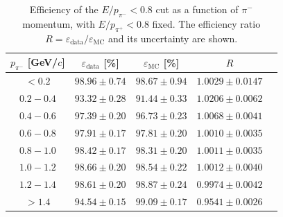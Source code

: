 \begin{table}[htbp]
    \begin{center}
        \caption{Efficiency of the \(E/p_{\pi^-}<0.8\) cut as a function of \(\pi^-\) momentum, with \(E/p_{\pi^+}<0.8\) fixed. The efficiency ratio \(R = \varepsilon_{\text{data}}/\varepsilon_{\text{MC}}\) and its uncertainty are shown.}
        \vspace{4mm}
        \renewcommand{\arraystretch}{1.3}
        \begin{tabular}{c | c c c c}
            \hline \hline
            \(p_{\pi^-}\) [GeV/\(c\)] & \(\varepsilon_{\text{data}}\) [\%] & \(\varepsilon_{\text{MC}}\) [\%] & \(R\) \\
            \hline
            \(<0.2\)   & \(98.96\pm0.74\) & \(98.67\pm0.94\) & \(1.0029\pm0.0147\) \\
            \(0.2-0.4\) & \(93.32\pm0.28\) & \(91.44\pm0.33\) & \(1.0206\pm0.0062\) \\
            \(0.4-0.6\) & \(97.39\pm0.20\) & \(96.73\pm0.23\) & \(1.0068\pm0.0041\) \\
            \(0.6-0.8\) & \(97.91\pm0.17\) & \(97.81\pm0.20\) & \(1.0010\pm0.0035\) \\
            \(0.8-1.0\) & \(98.42\pm0.17\) & \(98.31\pm0.20\) & \(1.0011\pm0.0035\) \\
            \(1.0-1.2\) & \(98.66\pm0.20\) & \(98.54\pm0.22\) & \(1.0012\pm0.0040\) \\
            \(1.2-1.4\) & \(98.61\pm0.20\) & \(98.87\pm0.24\) & \(0.9974\pm0.0042\) \\
            \(>1.4\)    & \(94.54\pm0.15\) & \(99.09\pm0.17\) & \(0.9541\pm0.0026\) \\
            \hline \hline
        \end{tabular}
        \label{tab:eop2_efficiency_pim}
    \end{center}
\end{table}

